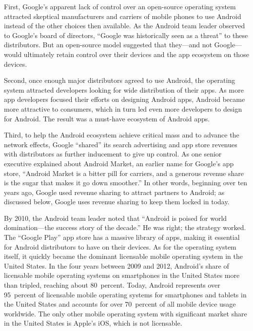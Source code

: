 \documentclass[11pt,b5paper,headings=small]{scrartcl}
\begin{document}

First, Google’s apparent lack of control over an open-source operating system
attracted skeptical manufacturers and carriers of mobile phones to use Android instead of the
other choices then available. As the Android team leader observed to Google’s board of
directors, “Google was historically seen as a threat” to these distributors. But an open-source
model suggested that they—and not Google—would ultimately retain control over their devices
and the app ecosystem on those devices.


Second, once enough major distributors agreed to use Android, the operating
system attracted developers looking for wide distribution of their apps. As more app developers
focused their efforts on designing Android apps, Android became more attractive to consumers,
which in turn led even more developers to design for Android. The result was a must-have
ecosystem of Android apps.


Third, to help the Android ecosystem achieve critical mass and to advance the
network effects, Google “shared” its search advertising and app store revenues with distributors
as further inducement to give up control. As one senior executive explained about Android
Market, an earlier name for Google’s app store, “Android Market is a bitter pill for carriers, and
a generous revenue share is the sugar that makes it go down smoother.” In other words,
beginning over ten years ago, Google used revenue sharing to attract partners to Android; as
discussed below, Google uses revenue sharing to keep them locked in today.


By 2010, the Android team leader noted that “Android is poised for world
domination—the success story of the decade.” He was right; the strategy worked. The “Google
Play” app store has a massive library of apps, making it essential for Android distributors to have
on their devices. As for the operating system itself, it quickly became the dominant licensable
mobile operating system in the United States. In the four years between 2009 and 2012,
Android’s share of licensable mobile operating systems on smartphones in the United States
more than tripled, reaching about 80~percent. Today, Android represents over 95~percent of
licensable mobile operating systems for smartphones and tablets in the United States and
accounts for over 70~percent of all mobile device usage worldwide. The only other mobile
operating system with significant market share in the United States is Apple’s iOS, which is not
licensable.
\end{document}

